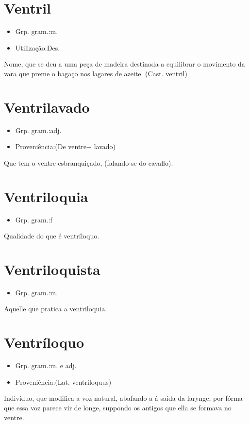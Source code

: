 \documentclass{article}
\begin{document}
\section{Ventril}
\begin{itemize}
\item {Grp. gram.:m.}
\end{itemize}
\begin{itemize}
\item {Utilização:Des.}
\end{itemize}
Nome, que se deu a uma peça de madeira destinada a equilibrar o movimento da vara que preme o bagaço nos lagares de azeite.
(Cast. \textunderscore ventril\textunderscore )
\section{Ventrilavado}
\begin{itemize}
\item {Grp. gram.:adj.}
\end{itemize}
\begin{itemize}
\item {Proveniência:(De \textunderscore ventre\textunderscore  + \textunderscore lavado\textunderscore )}
\end{itemize}
Que tem o ventre esbranquiçado, (falando-se do cavallo).
\section{Ventriloquia}
\begin{itemize}
\item {Grp. gram.:f}
\end{itemize}
Qualidade do que é ventríloquo.
\section{Ventriloquista}
\begin{itemize}
\item {Grp. gram.:m.}
\end{itemize}
Aquelle que pratica a ventriloquia.
\section{Ventríloquo}
\begin{itemize}
\item {Grp. gram.:m.  e  adj.}
\end{itemize}
\begin{itemize}
\item {Proveniência:(Lat. \textunderscore ventriloquus\textunderscore )}
\end{itemize}
Indivíduo, que modifica a voz natural, abafando-a á saída da larynge, por fórma que essa voz parece vir de longe, suppondo os antigos que ella se formava no ventre.
\end{document}
